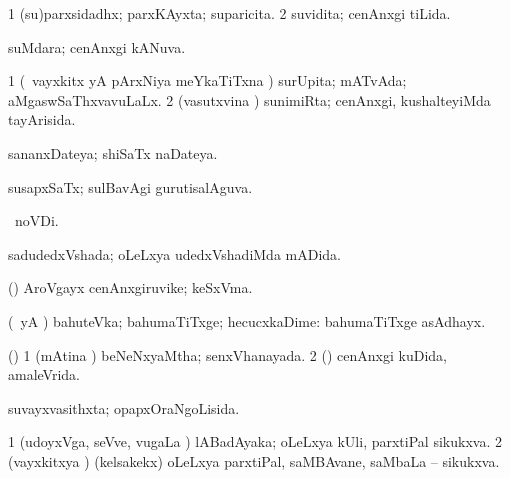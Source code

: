 {{{\bentry
{} 
\gl{\gu}
\expl{}
\bmng
\bnum
\num{1} (su)parxsidadhx; parxKAyxta; suparicita. 
\num{2} suvidita; cenAnxgi tiLida. 
\enum
\emng
\eentry

\bentry
{} 
\gl{\gu}
\expl{}
\bmng
suMdara; cenAnxgi kANuva. 
\emng
\eentry

\bentry
{} 
\gl{\gu}
\expl{}
\bmng
\bnum
\num{1} (\kanmu\ vayxkitx yA pArxNiya meYkaTiTxna \vi) surUpita; mATvAda; aMgaswSaThxvavuLaLx. 
\num{2} (vasutxvina \vi) sunimiRta; cenAnxgi, kushalteyiMda tayArisida. 
\enum
\emng
\eentry

\bentry
{} 
\gl{\gu}
\expl{}
\bmng
sananxDateya; shiSaTx naDateya. 
\emng
\eentry

\bentry
{} 
\gl{\gu}
\expl{}
\bmng
susapxSaTx; sulBavAgi gurutisalAguva. 
\emng
\eentry

\bentry
{} 
\gl{\gu}
\expl{}
\bmng
{} \pagu\ noVDi. 
\emng
\eentry

\bentry
{} 
\gl{\gu}
\expl{}
\bmng
{} 
\emng
\eentry

\bentry
{} 
\gl{\gu}
\expl{}
\bmng
sadudedxVshada; oLeLxya udedxVshadiMda mADida. 
\emng
\eentry

\bentry
{} 
\gl{\nA}
\expl{}
\bmng
(\kanmu) AroVgayx cenAnxgiruvike; keSxVma. 
\emng
\eentry

\bentry
{} 
\gl{\kirxvi}
\expl{}
\bmng
(\pArxparx\ yA \alaMshA) bahuteVka; bahumaTiTxge; hecucxkaDime:  bahumaTiTxge asAdhayx. 
\emng
\eentry

\bentry
{} 
\gl{\gu}
\expl{}
\bmng
(\AmA) 
\bnum
\num{1} (mAtina \vi) beNeNxyaMtha; senxVhanayada. 
\num{2} (\ashi) cenAnxgi kuDida, amaleVrida. 
\enum
\emng
\eentry

\bentry
{} 
\gl{\gu}
\expl{}
\bmng
suvayxvasithxta; opapxOraNgoLisida. 
\emng
\eentry

\bentry
{} 
\gl{\gu}
\expl{}
\bmng
\bnum
\num{1} (udoyxVga, seVve, \mo vugaLa \vi) lABadAyaka; oLeLxya kUli, parxtiPal sikukxva. 
\num{2} (vayxkitxya \vi) (kelsakekx) oLeLxya parxtiPal, saMBAvane, saMbaLa -- sikukxva. 
\enum
\emng
\eentry

}}}
